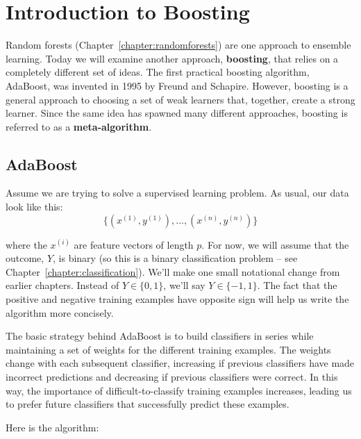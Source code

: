 \chapter{Introduction to Boosting \label{chapter:boosting}}

Random forests (Chapter~\ref{chapter:randomforests}) are one approach to ensemble learning. Today we will examine another approach, \textbf{boosting}, that relies on a completely different set of ideas. The first practical boosting algorithm, AdaBoost, was invented in 1995 by Freund and Schapire. However, boosting is a general approach to choosing a set of weak learners that, together, create a strong learner. Since the same idea has spawned many different approaches, boosting is referred to as a \textbf{meta-algorithm}. 


\section{AdaBoost}

Assume we are trying to solve a supervised learning problem. As usual, our data look like this:
$$\{ (x^{(1)}, y^{(1)}),  \dots, (x^{(n)}, y^{(n)}) \}$$

\noindent where the $x^{(i)}$ are feature vectors of length $p$. For now, we will assume that the outcome, $Y$, is binary (so this is a binary classification problem -- see Chapter~\ref{chapter:classification}). We'll make one small notational change from earlier chapters. Instead of $Y \in \{0, 1\}$, we'll say $Y \in \{-1, 1\}$. The fact that the positive and negative training examples have opposite sign will help us write the algorithm more concisely. 

The basic strategy behind AdaBoost is to build classifiers in series while maintaining a set of weights for the different training examples. The weights change with each subsequent classifier, increasing if previous classifiers have made incorrect predictions and decreasing if previous classifiers were correct. In this way, the importance of difficult-to-classify training examples increases, leading us to prefer future classifiers that successfully predict these examples. 

Here is the algorithm:


